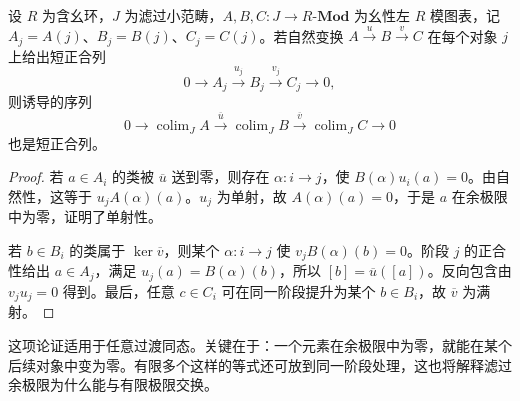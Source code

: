 \begin{proposition}[滤过余极限的正合性]\label{b4:prop:filtered-colimits-exact}
	设 \(R\) 为含幺环，\(J\) 为滤过小范畴，\(A,B,C:J\rightarrow R\text{-}\mathbf{Mod}\) 为幺性左 \(R\) 模图表，记 \(A_j=A(j)\)、\(B_j=B(j)\)、\(C_j=C(j)\)。若自然变换 \(A\xrightarrow{u}B\xrightarrow{v}C\) 在每个对象 \(j\) 上给出短正合列
	\[
		0\longrightarrow A_j\xrightarrow{u_j}B_j \xrightarrow{v_j}C_j\longrightarrow0,
	\]
	则诱导的序列
	\[
		0\longrightarrow\operatorname{colim}_JA \xrightarrow{\overline u}\operatorname{colim}_JB \xrightarrow{\overline v}\operatorname{colim}_JC \longrightarrow0
	\]
	也是短正合列。
\end{proposition}
\begin{proof}
	若 \(a\in A_i\) 的类被 \(\overline u\) 送到零，则存在 \(\alpha:i\rightarrow j\)，使 \(B(\alpha)u_i(a)=0\)。由自然性，这等于 \(u_jA(\alpha)(a)\)。\(u_j\) 为单射，故 \(A(\alpha)(a)=0\)，于是 \(a\) 在余极限中为零，证明了单射性。

	若 \(b\in B_i\) 的类属于 \(\ker\overline v\)，则某个 \(\alpha:i\rightarrow j\) 使 \(v_jB(\alpha)(b)=0\)。阶段 \(j\) 的正合性给出 \(a\in A_j\)，满足 \(u_j(a)=B(\alpha)(b)\)，所以 \([b]=\overline u([a])\)。反向包含由 \(v_ju_j=0\) 得到。最后，任意 \(c\in C_i\) 可在同一阶段提升为某个 \(b\in B_i\)，故 \(\overline v\) 为满射。
\end{proof}

这项论证适用于任意过渡同态。关键在于：一个元素在余极限中为零，就能在某个后续对象中变为零。有限多个这样的等式还可放到同一阶段处理，这也将解释滤过余极限为什么能与有限极限交换。

